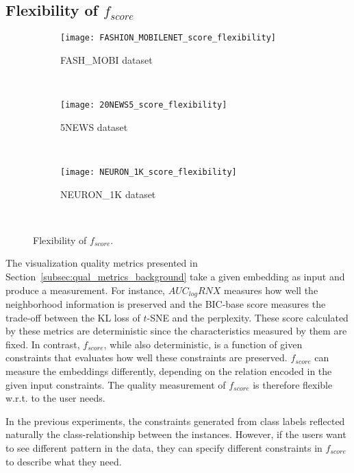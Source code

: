 \subsection{Flexibility of $f_{score}$}\label{sec:result:flexibility}

\begin{figure*}[ht!]
    \centering
    \begin{subfigure}[b]{.32\linewidth}
        \texttt{[image: FASHION\_MOBILENET\_score\_flexibility]}
        \caption{{FASH\_MOBI} dataset}
        \label{fig:flexibility:FASHMOBI}
    \end{subfigure}
    ~
    \begin{subfigure}[b]{.32\linewidth}
        \texttt{[image: 20NEWS5\_score\_flexibility]}
        \caption{5NEWS dataset}
        \label{fig:flexibility:5NEWS}
    \end{subfigure}
    ~
    \begin{subfigure}[b]{.32\linewidth}
        \texttt{[image: NEURON\_1K\_score\_flexibility]}
        \caption{{NEURON\_1K} dataset}
        \label{fig:flexibility:NEURON1K}
    \end{subfigure}
    ~
    \caption{Flexibility of $f_{score}$.}
    \label{fig:flexibility}
\end{figure*}

The visualization quality metrics presented in Section~\ref{subsec:qual_metrics_background} take a given embedding as input and produce a measurement.
For instance, $AUC_{log}RNX$ measures how well the neighborhood information is preserved and the BIC-base score measures the trade-off between the KL loss of $t$-SNE and the perplexity.
These score calculated by these metrics are deterministic since the characteristics measured by them are fixed.
In contrast, $f_{score}$, while also deterministic, is a function of given constraints that evaluates how well these constraints are preserved.
$f_{score}$ can measure the embeddings differently, depending on the relation encoded in the given input constraints. The quality measurement of $f_{score}$ is therefore flexible w.r.t. to the user needs.

In the previous experiments, the constraints generated from class labels reflected naturally the class-relationship between the instances.
However, if the users want to see different pattern in the data, they can specify different constraints in $f_{score}$ to describe what they need.

